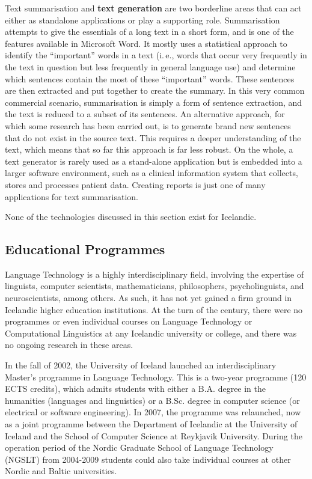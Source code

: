 \begin{multicols}{2}
Text summarisation and \textbf{text generation} are two borderline areas that can act either as standalone applications or play a supporting role. Summarisation attempts to give the essentials of a long text in a short form, and is one of the features available in Microsoft Word. It mostly uses a statistical approach to identify the “important” words in a text (i.\,e., words that occur very frequently in the text in question but less frequently in general language use) and determine which sentences contain the most of these “important” words. These sentences are then extracted and put together to create the summary. In this very common commercial scenario, summarisation is simply a form of sentence extraction, and the text is reduced to a subset of its sentences. An alternative approach, for which some research has been carried out, is to generate brand new sentences that do not exist in the source text. 
This requires a deeper understanding of the text, which means that so far this approach is far less robust. On the whole, a text generator is rarely used as a stand-alone application but is embedded into a larger software environment, such as a clinical information system that collects, stores and processes patient data. Creating reports is just one of many applications for text summarisation.

None of the technologies discussed in this section exist for Icelandic.

\subsection{Educational Programmes}

Language Technology is a highly interdisciplinary field, involving the expertise of linguists, computer scientists, mathematicians, philosophers, psycholinguists, and neuroscientists, among others. As such, it has not yet gained a firm ground in Icelandic higher education institutions. At the turn of the century, there were no programmes or even individual courses on Language Technology or Computational Linguistics at any Icelandic university or college, and there was no ongoing research in these areas.

In the fall of 2002, the University of Iceland launched an interdisciplinary Master’s programme in Language Technology. This is a two-year programme (120 ECTS credits), which admits students with either a B.A. degree in the humanities (languages and linguistics) or a B.Sc. degree in computer science (or electrical or software engineering). In 2007, the programme was relaunched, now as a joint programme between the Department of Icelandic at the University of Iceland and the School of Computer Science at Reykjavik University. During the operation period of the Nordic Graduate School of Language Technology (NGSLT) from 2004-2009 students could also take individual courses at other Nordic and Baltic universities.


\end{multicols}
